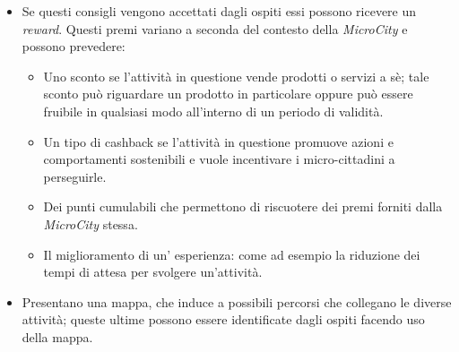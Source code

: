\begin{itemize}
    \item Se questi consigli vengono accettati dagli ospiti essi possono ricevere un \textit{reward}. Questi premi variano a seconda del contesto della \textit{MicroCity} e possono prevedere:
    \begin{itemize}
        \item Uno sconto se l'attività in questione vende prodotti o servizi a sè; tale sconto può riguardare un prodotto in particolare oppure può essere fruibile in qualsiasi modo all'interno di un periodo di validità.
        \item Un tipo di cashback se l'attività in questione promuove azioni e comportamenti sostenibili e vuole incentivare i micro-cittadini a perseguirle.
        \item Dei punti cumulabili che permettono di riscuotere dei premi forniti dalla \textit{MicroCity} stessa.
        \item Il miglioramento di un' esperienza:
        come ad esempio la riduzione dei tempi di attesa per svolgere un'attività.
    \end{itemize}
    \item Presentano una mappa, che induce a possibili percorsi che collegano le diverse attività; queste ultime possono essere identificate dagli ospiti facendo uso della mappa.
\end{itemize}
